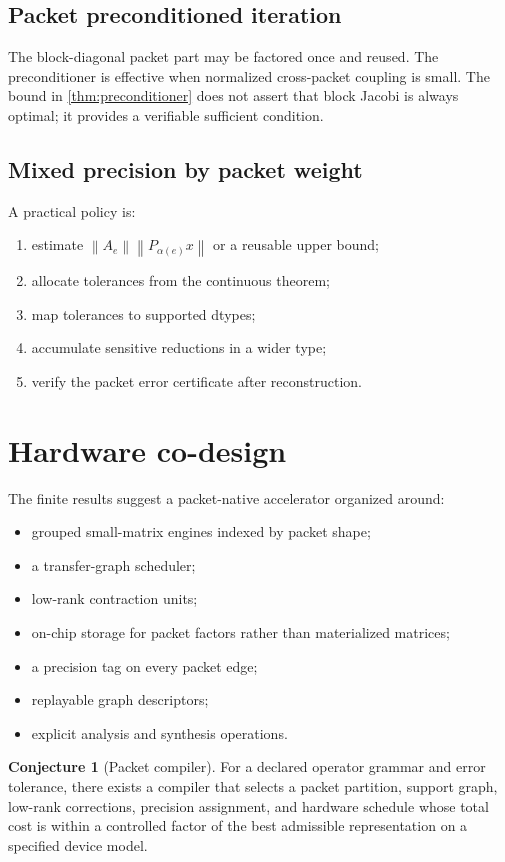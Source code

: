\documentclass[11pt]{article}
\theoremstyle{definition}
\newtheorem{conjecture}[theorem]{Conjecture}
\theoremstyle{remark}
\newcommand{\norm}[1]{\left\lVert#1\right\rVert}
\begin{document}
\subsection{Packet preconditioned iteration}

The block-diagonal packet part may be factored once and reused. The preconditioner is effective when normalized cross-packet coupling is small. The bound in \cref{thm:preconditioner} does not assert that block Jacobi is always optimal; it provides a verifiable sufficient condition.

\subsection{Mixed precision by packet weight}

A practical policy is:
\begin{enumerate}[leftmargin=1.6em]
\item estimate $\norm{A_e}\norm{P_{\alpha(e)}x}$ or a reusable upper bound;
\item allocate tolerances from the continuous theorem;
\item map tolerances to supported dtypes;
\item accumulate sensitive reductions in a wider type;
\item verify the packet error certificate after reconstruction.
\end{enumerate}

\section{Hardware co-design}

The finite results suggest a packet-native accelerator organized around:
\begin{itemize}[leftmargin=1.5em]
\item grouped small-matrix engines indexed by packet shape;
\item a transfer-graph scheduler;
\item low-rank contraction units;
\item on-chip storage for packet factors rather than materialized matrices;
\item a precision tag on every packet edge;
\item replayable graph descriptors;
\item explicit analysis and synthesis operations.
\end{itemize}

\begin{conjecture}[Packet compiler]
For a declared operator grammar and error tolerance, there exists a compiler that selects a packet partition, support graph, low-rank corrections, precision assignment, and hardware schedule whose total cost is within a controlled factor of the best admissible representation on a specified device model.
\end{conjecture}
\end{document}
